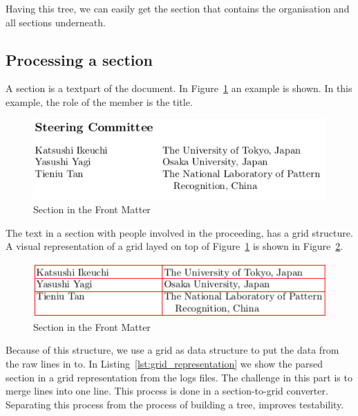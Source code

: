 \documentclass{ou-report}
\begin{document}
Having this tree, we can easily get the section that contains the organisation
and all sections underneath.
\subsection{Processing a section}
A section is a textpart of the document. In 
Figure~\ref{fig:front_matter_section} an example is shown. In this example, the
role of the member is the title.
\begin{figure}[H]
    \centering
    \includegraphics[width=12cm]{images/front_matter/section.png}
    \caption{Section in the Front Matter}
    \label{fig:front_matter_section}
\end{figure}
The text in a section with people involved in the proceeding, has a grid
structure. A visual representation of a grid layed on top of 
Figure~\ref{fig:front_matter_section} is shown in 
Figure~\ref{fig:front_matter_section_grid}. 
\begin{figure}[H]
    \centering
    \includegraphics[width=12cm]{images/front_matter/section_table.png}
    \caption{Section in the Front Matter}
    \label{fig:front_matter_section_grid}
\end{figure}
Because of this structure, we use a grid as data structure to put the data from 
the raw lines in to. In Listing~\ref{lst:grid_representation} we show the 
parsed section in a grid representation from the logs files. 
 The challenge in this part is to merge lines into one line.
This process is done in a section-to-grid converter. Separating this
process from the process of building a tree, improves testability.
\end{document}
